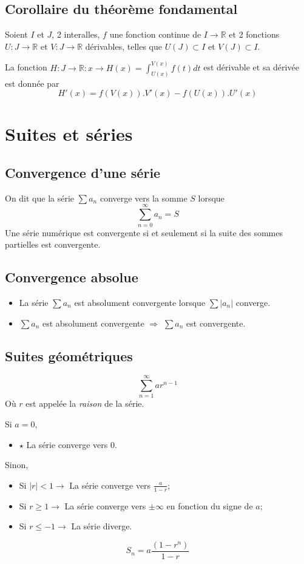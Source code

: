 \subsection{Corollaire du théorème fondamental}
Soient $I$ et $J$, 2 interalles,
$f$ une fonction continue de $I \rightarrow \mathbb{R}$ et
2 fonctions $U : J \rightarrow \mathbb{R}$ et
$V : J \rightarrow \mathbb{R}$ dérivables,
telles que $U(J) \subset I$ et $V(J) \subset I$.

La fonction
$H : J \rightarrow \mathbb{R} : x \rightarrow H(x) = \int_{U(x)}^{V(x)} f(t) dt$
est dérivable et sa dérivée est donnée par
\[ H'(x) = f(V(x)).V'(x) - f(U(x)).U'(x) \]

\section{Suites et séries}
\subsection{Convergence d'une série}
On dit que la série $\sum a_n$ converge vers la somme $S$ lorsque
\[ \sum_{n =0}^{\infty} a_n = S \]
Une série numérique est convergente si et seulement si
la suite des sommes partielles est convergente.

\subsection{Convergence absolue}
\begin{itemize}
  \item
    La série $\sum a_n$ est absolument convergente lorsque $\sum |a_n|$ converge.
  \item
    $\sum a_n$ est absolument convergente $\Rightarrow$ $\sum a_n$ est convergente.
\end{itemize}

\subsection{Suites géométriques}
\[ \sum_{n = 1}^{\infty} ar^{n-1} \]
Où $r$ est appelée la \emph{raison} de la série.

Si $a =0$,
\begin{itemize}
  \item $\star$ La série converge vers 0.
\end{itemize}
Sinon,
\begin{itemize}
  \item Si $|r| < 1 \rightarrow$ La série converge vers $\frac{a}{1 - r}$;
  \item Si $r \geq 1 \rightarrow$ La série converge vers $\pm \infty$
    en fonction du signe de $a$;
  \item Si $r \leq -1 \rightarrow$ La série diverge.
\end{itemize}
\[ S_n = a\frac{(1 - r^n)}{1- r} \]

